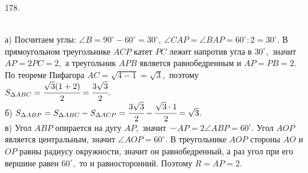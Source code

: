 178. \begin{figure}[ht!]
\end{figure}\\
а) Посчитаем углы: $\angle B=90^\circ-60^\circ=30^\circ,\ \angle CAP=\angle BAP=60^\circ:2=30^\circ.$ В прямоугольном треугольнике $ACP$ катет $PC$ лежит напротив угла в $30^\circ,$ значит $AP=2PC=2,$ а треугольник $APB$ является равнобедренным и $AP=PB=2.$ По теореме Пифагора $AC=\sqrt{4-1}=\sqrt{3},$ поэтому $S_{\Delta ABC}=\cfrac{\sqrt{3}(1+2)}{2}=\cfrac{3\sqrt{3}}{2}.$\\
б) $S_{\Delta ABP}=S_{\Delta ABC}-S_{\Delta ACP}=\cfrac{3\sqrt{3}}{2}-\cfrac{\sqrt{3}\cdot1}{2}=\sqrt{3}.$\\
в) Угол $ABP$ опирается на дугу $AP,$ значит $\smile AP=2\angle ABP=60^\circ.$ Угол $AOP$ является центральным, значит $\angle AOP=60^\circ.$ В треугольнике $AOP$ стороны $AO$ и $OP$ равны радиусу окружности, значит он равнобедренный, а раз угол при его вершине равен $60^\circ,$ то и равносторонний. Поэтому $R=AP=2.$\\
